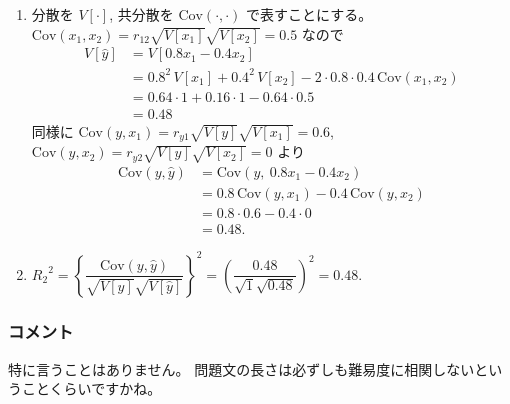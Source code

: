 \documentclass[./main.tex]{subfiles}
\begin{document}
\begin{enumerate}
        \item 分散を $V[\cdot]$, 共分散を $\mathrm{Cov} (\cdot, \cdot)$ で表すことにする。
        $\mathrm{Cov} (x_1, x_2) 
            = r_{12} \sqrt{V[x_1]} \sqrt{V[x_2]}
            = 0.5$
        なので
        \begin{align*}
            V[ \hat{y}] 
                &= V[ 0.8 x_1 - 0.4 x_2 ]\\
                &= 0.8^2 \, V[x_1] + 0.4^2 \, V[x_2] - 2 \cdot 0.8 \cdot 0.4 \, \mathrm{Cov} (x_1, x_2)\\
                &= 0.64 \cdot 1 + 0.16 \cdot 1 - 0.64 \cdot 0.5\\
                &= 0.48
        \end{align*}
        同様に $\mathrm{Cov} (y, x_1) = r_{y1} \sqrt{V[y]} \sqrt{V[x_1]} = 0.6$, \
        $\mathrm{Cov} (y, x_2) = r_{y2} \sqrt{V[y]} \sqrt{V[x_2]} = 0$ より
        \begin{align*}
            \mathrm{Cov} (y, \hat{y})
                &= \mathrm{Cov} (y, \ 0.8 x_1 - 0.4 x_2)\\
                &= 0.8 \, \mathrm{Cov} (y, x_1) - 0.4 \, \mathrm{Cov} (y, x_2)\\
                &= 0.8 \cdot 0.6 - 0.4 \cdot 0\\
                &= 0.48.
        \end{align*}

        \item ${R_2}^2
            = \left\{ \dfrac{\mathrm{Cov} (y, \hat{y})}{\sqrt{V[y]} \sqrt{V[\hat{y}]}} \right\}^2
            = \left( \dfrac{0.48}{\sqrt{1} \sqrt{0.48}} \right)^2
            = 0.48$.
        
    \end{enumerate}

    \subsubsection*{コメント}
    特に言うことはありません。
    問題文の長さは必ずしも難易度に相関しないということくらいですかね。
\end{document}
